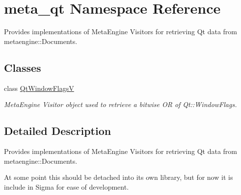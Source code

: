\hypertarget{namespacemeta__qt}{}\section{meta\+\_\+qt Namespace Reference}
\label{namespacemeta__qt}


Provides implementations of Meta\+Engine Visitors for retrieving Qt data from metaengine\+::\+Documents.  


\subsection*{Classes}
\begin{DoxyCompactItemize}
\item 
class \hyperlink{classmeta__qt_1_1_qt_window_flags_v}{Qt\+Window\+Flags\+V}
\begin{DoxyCompactList}\small\item\em Meta\+Engine Visitor object used to retrieve a bitwise O\+R of Qt\+::\+Window\+Flags. \end{DoxyCompactList}\end{DoxyCompactItemize}


\subsection{Detailed Description}
Provides implementations of Meta\+Engine Visitors for retrieving Qt data from metaengine\+::\+Documents. 

At some point this should be detached into it\textquotesingle{}s own library, but for now it is include in Sigma for ease of development. 
